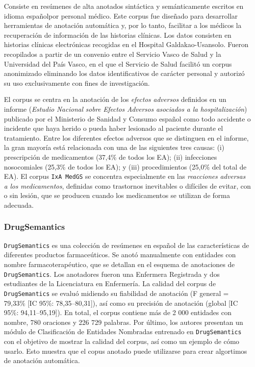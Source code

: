 Consiste en resúmenes de alta anotados sintáctica y semánticamente escritos en idioma españolpor personal médico.
Este corpus fue diseñado para desarrollar herramientas de anotación automática y, por lo tanto, facilitar a los médicos la recuperación de información de las historias clínicas.
Los datos consisten en historias clínicas electrónicas recogidas en el Hospital Galdakao-Usansolo.
Fueron recopilados a partir de un convenio entre el Servicio Vasco de Salud y la Universidad del País Vasco, en el que el Servicio de Salud facilitó un corpus anonimizado eliminando los datos identificativos de carácter personal y autorizó su uso exclusivamente con fines de investigación.

El corpus se centra en la anotación de los \textit{efectos adversos} definidos en un informe (\textit{Estudio Nacional sobre Efectos Adversos asociados a la hospitalización}) publicado por el Ministerio de Sanidad y Consumo español como todo accidente o incidente que haya herido o pueda haber lesionado al paciente durante el tratamiento.
Entre los diferentes efectos adversos que se distinguen en el informe, la gran mayoría está relacionada con una de las siguientes tres causas: (i) prescripción de medicamentos (37,4\% de todos los EA); (ii) infecciones nosocomiales (25,3\% de todos los EA); y (iii) procedimientos (25,0\% del total de EA).
El corpus \texttt{IxA MedGS} se concentra especialmente en las \textit{reacciones adversas a los medicamentos}, definidas como trastornos inevitables o difíciles de evitar, con o sin lesión, que se producen cuando los medicamentos se utilizan de forma adecuada.

\subsubsection*{DrugSemantics}

\texttt{DrugSemantics} es una colección de resúmenes en español de las características de diferentes productos farmaceúticos.
Se anotó manualmente con entidades con nombre farmacoterapéutico, que se detallan en el esquema de anotaciones de \texttt{DrugSemantics}.
Los anotadores fueron una Enfermera Registrada y dos estudiantes de la Licenciatura en Enfermería. La calidad del corpus de \texttt{DrugSemantics} se evaluó midiendo su fiabilidad de anotación (F general = 79,33\% [IC 95\%: 78,35–80,31]), así como su precisión de anotación (global [IC 95\%: 94,11–95,19]).
En total, el corpus contiene más de 2 000 entidades con nombre, 780 oraciones y 226 729 palabras. Por último, los autores presentan un módulo de Clasificación de Entidades Nombradas entrenado en \texttt{DrugSemantics} con el objetivo de mostrar la calidad del corpus, así como un ejemplo de cómo usarlo.
Esto muestra que el copus anotado puede utilizarse para crear algortimos de anotación automática.

